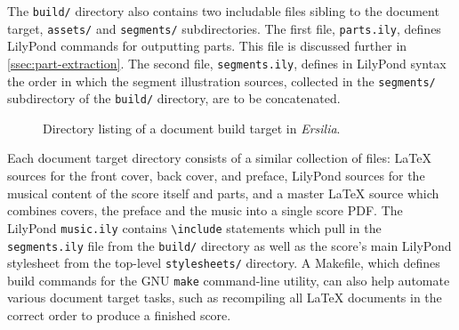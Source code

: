The \texttt{build/} directory also contains two includable files sibling to the
document target, \texttt{assets/} and \texttt{segments/} subdirectories.
The first file, \texttt{parts.ily}, defines LilyPond commands for outputting
parts. This file is discussed further in \autoref{ssec:part-extraction}. The
second file, \texttt{segments.ily}, defines in LilyPond syntax the order in
which the segment illustration sources, collected in the \texttt{segments/}
subdirectory of the \texttt{build/} directory, are to be concatenated.

\begin{figure}[h!]
\begin{singlespacing}
\vspace{-0.5\baselineskip}
\end{singlespacing}
\caption{Directory listing of a document build target in \emph{Ersilia}.}
\end{figure}

Each document target directory consists of a similar collection of files: LaTeX
sources for the front cover, back cover, and preface, LilyPond sources for the
musical content of the score itself and parts, and a master LaTeX source which
combines covers, the preface and the music into a single score PDF. The
LilyPond \texttt{music.ily} contains \texttt{\textbackslash{}include}
statements which pull in the \texttt{segments.ily} file from the
\texttt{build/} directory as well as the score's main LilyPond stylesheet from
the top-level \texttt{stylesheets/} directory. A Makefile, which defines build
commands for the GNU \texttt{make} command-line utility, can also help automate
various document target tasks, such as recompiling all LaTeX documents in the
correct order to produce a finished score.

